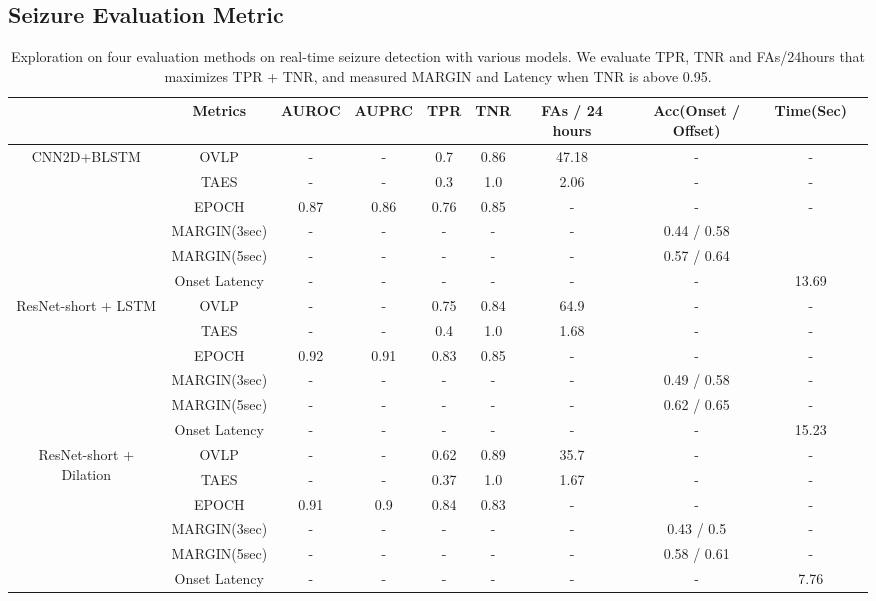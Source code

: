 \documentclass[pmlr,twocolumn,10pt]{jmlr}
\begin{document}
\subsection{Seizure Evaluation Metric}
\begin{table*}[ht!]
	\tiny
	\vspace{-25pt}
	\centering
	\caption{Exploration on four evaluation methods on real-time seizure detection with various models. We evaluate TPR, TNR and FAs/24hours that maximizes TPR + TNR, and measured MARGIN and Latency when TNR is above 0.95.}
	\label{eval_models}
	\begin{tabular}{c|c|cccccccc}
		\toprule
		& Metrics & AUROC & AUPRC & TPR & TNR & FAs / 24 hours & Acc(Onset / Offset) & Time(Sec) \\
		\midrule
		\multirow{6}{*}{CNN2D+BLSTM} 
		& OVLP & - & - & 0.7 & 0.86 & 47.18 & - & - \\
		& TAES & - & - & 0.3 & 1.0 & 2.06 & - & - \\
		& EPOCH & 0.87 & 0.86 & 0.76 & 0.85 & - & - & -  \\
		& MARGIN(3sec)  & - & - & - & - & - & 0.44 / 0.58 &   \\
		& MARGIN(5sec) & - & - & - & - & - & 0.57 / 0.64 & \\
		& Onset Latency & - & - & - & - & - & - & 13.69 \\

		\midrule
		\multirow{6}{*}{ResNet-short + LSTM} 
		& OVLP & - & - & 0.75 & 0.84 & 64.9 & - & - \\
		& TAES & - & - & 0.4 & 1.0 & 1.68 & - & - \\
		& EPOCH & 0.92 & 0.91 & 0.83 & 0.85 & - & - & -  \\
		& MARGIN(3sec)  & - & - & - & - & - & 0.49 / 0.58 & -  \\
		& MARGIN(5sec) & - & - & - & - & - & 0.62 / 0.65 & -  \\
		& Onset Latency & - & - & - & - & - & - & 15.23 \\

		\midrule
		\multirow{6}{*}{ResNet-short + Dilation} 
		& OVLP & - & - & 0.62 & 0.89 & 35.7 & - & - \\
		& TAES & - & - & 0.37 & 1.0 & 1.67 & - & - \\
		& EPOCH & 0.91 & 0.9 & 0.84 & 0.83 & - & - & -  \\
		& MARGIN(3sec)  & - & - & - & - & - & 0.43 / 0.5 &  - \\
		+ LSTM& MARGIN(5sec) & - & - & - & - & - & 0.58 / 0.61 & -  \\
		& Onset Latency & - & - & - & - & - & - & 7.76 \\


\end{tabular}
\end{table*}
\end{document}
